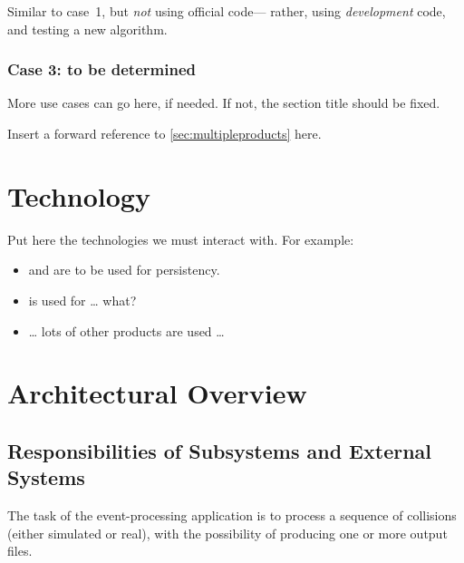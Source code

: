 \documentclass[draftmode]{memarticle}
\newcommand{\Phedex}{\productname{Phedex}}
\newcommand{\Pool}{\productname{Pool}}
\newcommand{\Root}{\productname{Root}}
\begin{document}
\begin{fixme}
Similar to case~1, but \emph{not} using official code---%
rather, using \emph{development} code,
and testing a new algorithm.
\end{fixme}

\subsection{Case 3: to be determined}

\begin{fixme}
More use cases can go here, if needed.
If not, the section title should be fixed.
\end{fixme}

\begin{fixme}
Insert a forward reference to \vref{sec:multipleproducts} here.
\end{fixme}

\chapter{Technology}

\begin{fixme}
Put here the technologies we must interact with.
For example:
\begin{itemize}
\item \Pool and \Root are to be used for persistency.
\item \Phedex is used for {\ldots} what?
\item {\ldots} lots of other products are used {\ldots}
\end{itemize}
\end{fixme}

\chapter{Architectural Overview}

\section{Responsibilities of Subsystems and External Systems}

The task of the event-processing application
is to process a sequence of collisions
(either simulated or real),
with the possibility of producing one or more output files.
\end{document}
